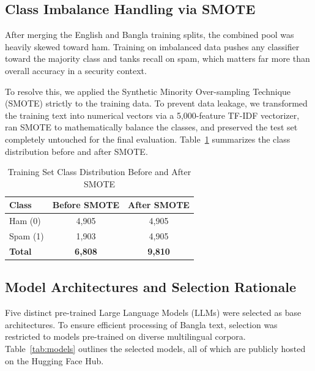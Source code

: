 \documentclass[journal]{IEEEtran}
\begin{document}
\subsection{Class Imbalance Handling via SMOTE}

After merging the English and Bangla training splits, the combined pool was heavily skewed toward ham. Training on imbalanced data pushes any classifier toward the majority class and tanks recall on spam, which matters far more than overall accuracy in a security context.

To resolve this, we applied the Synthetic Minority Over-sampling Technique (SMOTE) strictly to the training data. To prevent data leakage, we transformed the training text into numerical vectors via a 5,000-feature TF-IDF vectorizer, ran SMOTE to mathematically balance the classes, and preserved the test set completely untouched for the final evaluation. Table~\ref{tab:smote} summarizes the class distribution before and after SMOTE.

\begin{table}[htbp]
\caption{Training Set Class Distribution Before and After SMOTE}
\label{tab:smote}
\centering
\begin{tabular}{lcc}
\toprule
\textbf{Class} & \textbf{Before SMOTE} & \textbf{After SMOTE} \\
\midrule
Ham (0) & 4,905 & 4,905 \\
Spam (1) & 1,903 & 4,905 \\
\midrule
\textbf{Total} & \textbf{6,808} & \textbf{9,810} \\
\bottomrule
\end{tabular}
\end{table}

\subsection{Model Architectures and Selection Rationale}

Five distinct pre-trained Large Language Models (LLMs) were selected as base architectures. To ensure efficient processing of Bangla text, selection was restricted to models pre-trained on diverse multilingual corpora. Table~\ref{tab:models} outlines the selected models, all of which are publicly hosted on the Hugging Face Hub.

\begin{table}[htbp]
\caption{Selected Pretrained LLMs}
\label{tab:models}
\centering
{}
\end{table}
\end{document}
